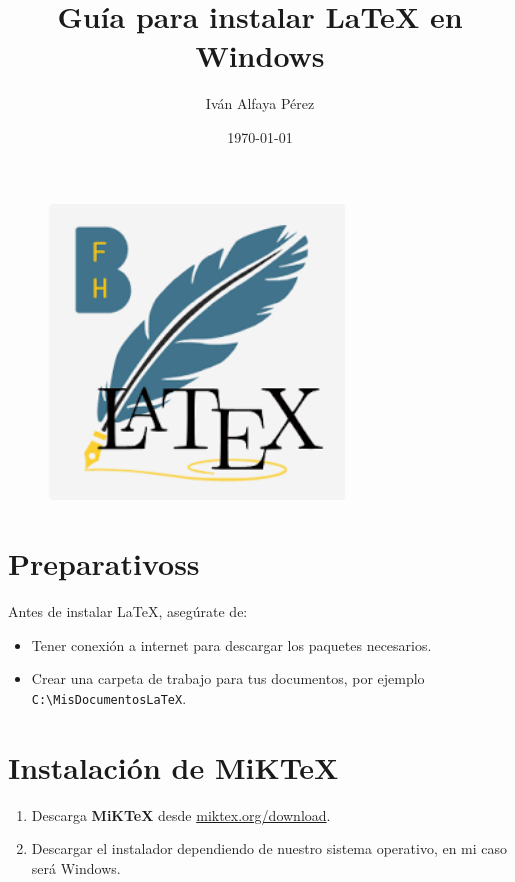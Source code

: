 \documentclass{article}
\title{Guía para instalar LaTeX en Windows}
\author{Iván Alfaya Pérez}
\date{\today}
\begin{document}
\maketitle

\begin{figure}[h!]
    \centering
    \includegraphics[width=0.7\textwidth]{latex.png}
\end{figure}
\newpage
\tableofcontents

\newpage

\section{Preparativoss}
Antes de instalar LaTeX, asegúrate de:

\begin{itemize}
    \item Tener conexión a internet para descargar los paquetes necesarios.
    \item Crear una carpeta de trabajo para tus documentos, por ejemplo \texttt{C:\textbackslash MisDocumentosLaTeX}.
\end{itemize}

\section{Instalación de MiKTeX}
\begin{enumerate}
    \item Descarga \textbf{MiKTeX} desde \href{https://miktex.org/download}{miktex.org/download}.
    
    \item Descargar el instalador dependiendo de nuestro sistema operativo, en mi caso será Windows.
\end{enumerate}
\end{document}
